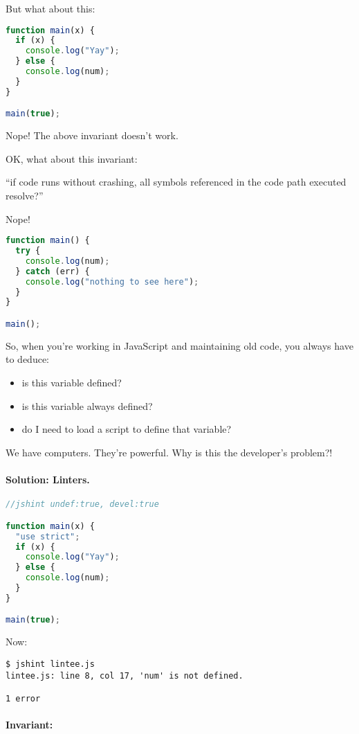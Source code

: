 \documentclass[11pt]{article}
\begin{document}
{But what about this:
\begin{lstlisting}[language=JavaScript]
function main(x) {
  if (x) {
    console.log("Yay");
  } else {
    console.log(num);
  }
}

main(true);
\end{lstlisting}
Nope! The above invariant doesn't work.

OK, what about this invariant:
\begin{center}
``if code runs without crashing, all symbols referenced in the code path executed resolve?''
\end{center}

Nope!
\begin{lstlisting}[language=JavaScript]
function main() {
  try {
    console.log(num);
  } catch (err) {
    console.log("nothing to see here");
  }
}

main();
\end{lstlisting}

So, when you're working in JavaScript and maintaining old code, you always have to
deduce:
\begin{itemize}[noitemsep]
\item is this variable defined?
\item is this variable always defined?
\item do I need to load a script to define that variable?
\end{itemize}
We have computers. They're powerful. Why is this the developer's problem?!

\paragraph{Solution: Linters.}
\begin{lstlisting}[language=JavaScript]
//jshint undef:true, devel:true

function main(x) {
  "use strict";
  if (x) {
    console.log("Yay");
  } else {
    console.log(num);
  }
}

main(true);
\end{lstlisting}

Now:
\begin{verbatim}
$ jshint lintee.js
lintee.js: line 8, col 17, 'num' is not defined.

1 error
\end{verbatim}

\vspace*{-2em}
\paragraph{Invariant:}~\\[-2em]

}
\end{document}
